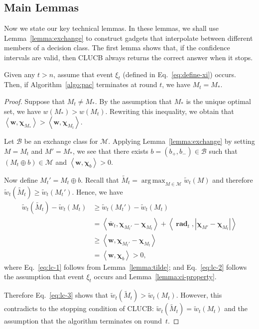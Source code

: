 \documentclass{article}
\newcommand{\Algorithm}{{\small \textsf{CLUCB}}\xspace}
\newcommand{\M}{\mathcal M}
\newcommand{\B}{\mathcal B}
\DeclareMathOperator{\rad}{rad}
\DeclareMathOperator*{\argmax}{arg\,max}
\newcommand{\inn}[1]{\left\langle #1 \right\rangle}
\renewcommand{\vec}[1]{\boldsymbol{#1}}
\begin{document}
\subsection{Main Lemmas}

Now we state our key technical lemmas.
In these lemmas, we shall use Lemma~\ref{lemma:exchange} to construct gadgets that interpolate between different members of a decision class.
The first lemma shows that, if the confidence intervals are valid, then \Algorithm always returns the correct answer when it stops.
\begin{lemma}
\label{lemma:correct}
Given any $t > n$, assume that event $\xi_t$ (defined in Eq.~\eqref{eq:define-xi}) occurs.
Then, if Algorithm~\ref{algo:pac} terminates at round $t$, we have $M_t=M_*$.
\end{lemma}

\begin{proof}
Suppose that $M_t \not= M_*$. 
By the assumption that $M_*$ is the unique optimal set, we have $w(M_*)>w(M_t)$. 
Rewriting this inequality, we obtain that $\inn{\vec w, \vec\chi_{M_*}} > \inn{\vec w,\vec\chi_{M_t}}$.

Let $\B$ be an exchange class for $\M$.
Applying Lemma~\ref{lemma:exchange} by setting $M=M_t$ and $M'=M_*$, we see that 
there exists $b=(b_+,b_-)\in \B$ such that $(M_t \oplus b) \in \M$ and $\inn{\vec w, \vec\chi_b} > 0$.


Now define $M_t' = M_t \oplus b$.
Recall that $\tilde M_t =\argmax_{M\in \M} \tilde w_t(M)$ and therefore $\tilde w_t(\tilde M_t) \ge \tilde w_t(M_t')$.
Hence, we have
\begin{align}
  \tilde w_t(\tilde M_t)-\tilde w_t(M_t) 
  &\ge \tilde w_t(M_t')-\tilde w_t(M_t) \nonumber \\
  &= \inn{\vec {\bar w}_t, \vec \chi_{M_t'}-\vec\chi_{M_t}}+\inn{\vec \rad_t, |\vec \chi_{M'}-\vec\chi_{M_t}|} \label{eq:lc-1}\\
  &\ge \inn{\vec w, \vec \chi_{M_t'}-\vec\chi_{M_t}} \label{eq:lc-2}\\
  &= \inn{\vec w,\vec\chi_b} > 0 \label{eq:lc-3},
\end{align}
where Eq.~\eqref{eq:lc-1} follows from Lemma~\ref{lemma:tilde};
and Eq.~\eqref{eq:lc-2} follows the assumption that event $\xi_t$ occurs and Lemma~\ref{lemma:ci-property}.

Therefore Eq.~\eqref{eq:lc-3} shows that $\tilde w_t(\tilde M_t) > \tilde w_t(M_t)$. 
However, this contradicts to the stopping condition of \Algorithm: $\tilde w_t(\tilde M_t) = \tilde w_t(M_t)$ and the assumption that the algorithm terminates on round~$t$.
\end{proof}
\end{document}
